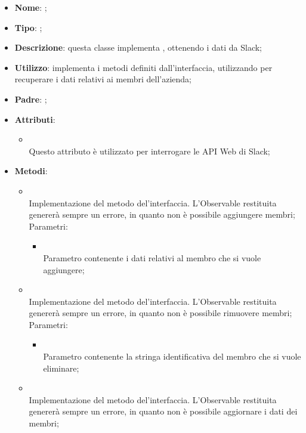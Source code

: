 \begin{itemize}
	\item \textbf{Nome}: ;
	\item \textbf{Tipo}: ;
	\item \textbf{Descrizione}: questa classe implementa , ottenendo i dati da Slack;
	\item \textbf{Utilizzo}: implementa i metodi definiti dall'interfaccia, utilizzando  per recuperare i dati relativi ai membri dell'azienda;
	\item \textbf{Padre}: ;
	\item \textbf{Attributi}:
	\begin{itemize}
		\item[]  \\
		Questo attributo è utilizzato per interrogare le API Web di Slack;
	\end{itemize}
	\item \textbf{Metodi}:
	\begin{itemize}
		\item[]  \\
		Implementazione del metodo del'interfaccia. L'Observable restituita genererà sempre un errore, in quanto non è possibile aggiungere membri;\\
		Parametri:
		\begin{itemize}
			\item {} \\
			Parametro contenente i dati relativi al membro che si vuole aggiungere;
		\end{itemize}
		\item[]  \\
		Implementazione del metodo del'interfaccia. L'Observable restituita genererà sempre un errore, in quanto non è possibile rimuovere membri;\\
		Parametri:
		\begin{itemize}
			\item {} \\
			Parametro contenente la stringa identificativa del membro che si vuole eliminare;
		\end{itemize}
		\item[]  \\
		Implementazione del metodo del'interfaccia. L'Observable restituita genererà sempre un errore, in quanto non è possibile aggiornare i dati dei membri;\\

\end{itemize}
\end{itemize}
